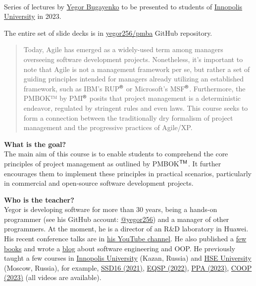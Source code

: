 \documentclass[nobrand,anonymous,nodate,nosecurity]{huawei}
\newcommand\REG{$^{\tiny{\textsf{\textregistered}}}$}
\newcommand\TM{$^{\tiny{\textsf{TM}}}$}
\begin{document}
{\\
Series of lectures by \href{https://www.yegor256.com}{Yegor Bugayenko} to be presented
to students of \href{https://innopolis.university/en/}{Innopolis University} in 2023.

The entire set of slide decks is in \href{https://github.com/yegor256/pmba}{yegor256/pmba} GitHub repository.

\begin{abstract}
Today, Agile has emerged as a widely-used term among managers overseeing software development projects. Nonetheless, it's important to note that Agile is not a management framework per se, but rather a set of guiding principles intended for managers already utilizing an established framework, such as IBM's RUP\REG{} or Microsoft's MSF\REG{}. Furthermore, the PMBOK™ by PMI\REG{} posits that project management is a deterministic endeavor, regulated by stringent rules and even laws. This course seeks to form a connection between the traditionally dry formalism of project management and the progressive practices of Agile/XP.
\end{abstract}

\textbf{What is the goal?}\\
The main aim of this course is to enable students to comprehend the core principles of project management as outlined by PMBOK\TM{}. It further encourages them to implement these principles in practical scenarios, particularly in commercial and open-source software development projects.

\textbf{Who is the teacher?}\\
Yegor is developing software for more than 30 years, being a hands-on programmer
(see his GitHub account: \href{https://github.com/yegor256}{@yegor256})
and a manager of other programmers. At the moment, he is a director
of an R\&D laboratory in Huawei. His recent conference talks are in
\href{https://www.youtube.com/channel/UCr9qCdqXLm2SU0BIs6d_68Q}{his YouTube channel}.
He also published a \href{https://www.yegor256.com/books.html}{few books}
and wrote a \href{https://www.yegor256.com/contents.html}{blog} about software engineering
and OOP.
He previously taught a few courses in
\href{https://innopolis.university/}{Innopolis University} (Kazan, Russia)
and
\href{https://hse.ru}{HSE University} (Moscow, Russia),
for example,
\href{https://github.com/yegor256/ssd16}{SSD16 (2021)},
\href{https://github.com/yegor256/eqsp}{EQSP (2022)},
\href{https://github.com/yegor256/ppa}{PPA (2023)},
\href{https://github.com/yegor256/painofoop}{COOP (2023)}
(all videos are available).

}
\end{document}
